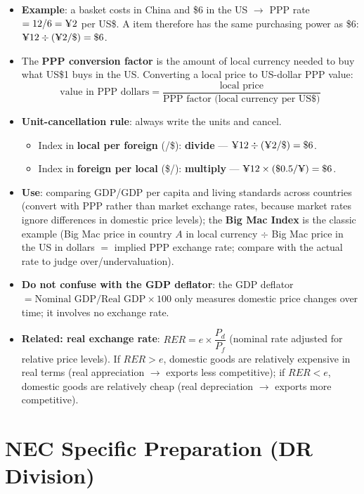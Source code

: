 \documentclass[a4paper,12pt]{article}
\newcommand{\needbold}[1]{\textcolor{red!70!black}{\textbf{#1}}}
\begin{document}
\begin{itemize}
  \item \textbf{Example}: a basket costs  in China and \$6 in the US $\to$ PPP rate $= 12/6 = \text{\textyen}2$ per US\$. A  item therefore has the same purchasing power as \$6: $\text{\textyen}12 \div (\text{\textyen}2/\$) = \$6$.
  \item The \needbold{PPP conversion factor} is the amount of local currency needed to buy what US\$1 buys in the US. Converting a local price to US-dollar PPP value:
  \[\text{value in PPP dollars} = \dfrac{\text{local price}}{\text{PPP factor (local currency per US\$)}}\]
  \item \textbf{Unit-cancellation rule}: always write the units and cancel.
  \begin{itemize}
    \item Index in \textbf{local per foreign} (\textyen/\$): \textbf{divide} --- $\text{\textyen}12 \div (\text{\textyen}2/\$) = \$6$. \checkmark
    \item Index in \textbf{foreign per local} (\$/\textyen): \textbf{multiply} --- $\text{\textyen}12 \times (\$0.5/\text{\textyen}) = \$6$. \checkmark
  \end{itemize}
  \item \textbf{Use}: comparing GDP/GDP per capita and living standards across countries (convert with PPP rather than market exchange rates, because market rates ignore differences in domestic price levels); the \textbf{Big Mac Index} is the classic example (Big Mac price in country $A$ in local currency $\div$ Big Mac price in the US in dollars $=$ implied PPP exchange rate; compare with the actual rate to judge over/undervaluation).
  \item \textbf{Do not confuse with the GDP deflator}: the GDP deflator $= \text{Nominal GDP}/\text{Real GDP} \times 100$ only measures domestic price changes over time; it involves no exchange rate.
  \item \textbf{Related: real exchange rate}: $RER = e \times \dfrac{P_d}{P_f}$ (nominal rate adjusted for relative price levels). If $RER > e$, domestic goods are relatively expensive in real terms (real appreciation $\to$ exports less competitive); if $RER < e$, domestic goods are relatively cheap (real depreciation $\to$ exports more competitive).
\end{itemize}

\newpage
\section*{NEC Specific Preparation (DR Division)}\label{sec:nec-prep}
\end{document}
